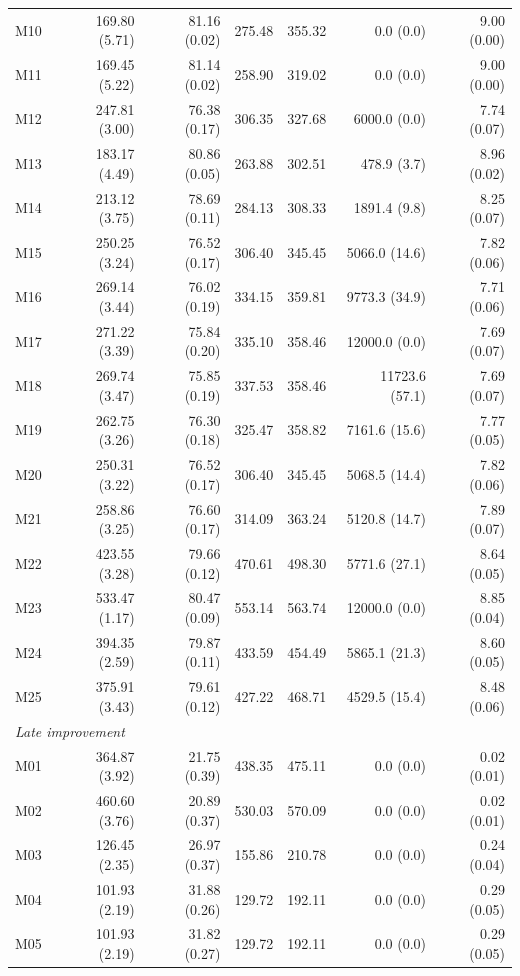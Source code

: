 \documentclass[11pt]{article}
\theoremstyle{remark}
\begin{document}
\begin{longtable}{lrrrrrr}
M10 & 169.80 (5.71) & 81.16 (0.02) & 275.48 & 355.32 & 0.0 (0.0) & 9.00 (0.00) \\
M11 & 169.45 (5.22) & 81.14 (0.02) & 258.90 & 319.02 & 0.0 (0.0) & 9.00 (0.00) \\
M12 & 247.81 (3.00) & 76.38 (0.17) & 306.35 & 327.68 & 6000.0 (0.0) & 7.74 (0.07) \\
M13 & 183.17 (4.49) & 80.86 (0.05) & 263.88 & 302.51 & 478.9 (3.7) & 8.96 (0.02) \\
M14 & 213.12 (3.75) & 78.69 (0.11) & 284.13 & 308.33 & 1891.4 (9.8) & 8.25 (0.07) \\
M15 & 250.25 (3.24) & 76.52 (0.17) & 306.40 & 345.45 & 5066.0 (14.6) & 7.82 (0.06) \\
M16 & 269.14 (3.44) & 76.02 (0.19) & 334.15 & 359.81 & 9773.3 (34.9) & 7.71 (0.06) \\
M17 & 271.22 (3.39) & 75.84 (0.20) & 335.10 & 358.46 & 12000.0 (0.0) & 7.69 (0.07) \\
M18 & 269.74 (3.47) & 75.85 (0.19) & 337.53 & 358.46 & 11723.6 (57.1) & 7.69 (0.07) \\
M19 & 262.75 (3.26) & 76.30 (0.18) & 325.47 & 358.82 & 7161.6 (15.6) & 7.77 (0.05) \\
M20 & 250.31 (3.22) & 76.52 (0.17) & 306.40 & 345.45 & 5068.5 (14.4) & 7.82 (0.06) \\
M21 & 258.86 (3.25) & 76.60 (0.17) & 314.09 & 363.24 & 5120.8 (14.7) & 7.89 (0.07) \\
M22 & 423.55 (3.28) & 79.66 (0.12) & 470.61 & 498.30 & 5771.6 (27.1) & 8.64 (0.05) \\
M23 & 533.47 (1.17) & 80.47 (0.09) & 553.14 & 563.74 & 12000.0 (0.0) & 8.85 (0.04) \\
M24 & 394.35 (2.59) & 79.87 (0.11) & 433.59 & 454.49 & 5865.1 (21.3) & 8.60 (0.05) \\
M25 & 375.91 (3.43) & 79.61 (0.12) & 427.22 & 468.71 & 4529.5 (15.4) & 8.48 (0.06) \\
\multicolumn{7}{l}{\textit{Late improvement}} \\
M01 & 364.87 (3.92) & 21.75 (0.39) & 438.35 & 475.11 & 0.0 (0.0) & 0.02 (0.01) \\
M02 & 460.60 (3.76) & 20.89 (0.37) & 530.03 & 570.09 & 0.0 (0.0) & 0.02 (0.01) \\
M03 & 126.45 (2.35) & 26.97 (0.37) & 155.86 & 210.78 & 0.0 (0.0) & 0.24 (0.04) \\
M04 & 101.93 (2.19) & 31.88 (0.26) & 129.72 & 192.11 & 0.0 (0.0) & 0.29 (0.05) \\
M05 & 101.93 (2.19) & 31.82 (0.27) & 129.72 & 192.11 & 0.0 (0.0) & 0.29 (0.05) \\

\end{longtable}
\end{document}
